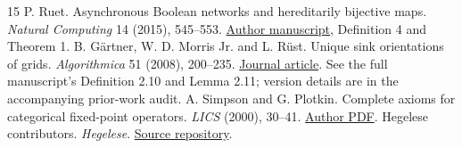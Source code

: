 \documentclass[11pt,a4paper]{article}
\theoremstyle{definition}
\theoremstyle{remark}
\begin{document}
\begin{thebibliography}{15}
 P. Ruet. Asynchronous Boolean networks and hereditarily bijective maps. \emph{Natural Computing} 14 (2015), 545--553. \href{https://www.irif.fr/~ruet/papiers/naco.pdf}{Author manuscript}, Definition 4 and Theorem 1.
 B. G\"artner, W. D. Morris Jr. and L. R\"ust. Unique sink orientations of grids. \emph{Algorithmica} 51 (2008), 200--235. \href{https://doi.org/10.1007/s00453-007-9090-x}{Journal article}. See the full manuscript's Definition 2.10 and Lemma 2.11; version details are in the accompanying prior-work audit.
 A. Simpson and G. Plotkin. Complete axioms for categorical fixed-point operators. \emph{LICS} (2000), 30--41. \href{https://homepages.inf.ed.ac.uk/gdp/publications/fixpoints.pdf}{Author PDF}.
 Hegelese contributors. \emph{Hegelese}. \href{https://github.com/Mikael-Codes/hegelese}{Source repository}.
\end{thebibliography}
\end{document}
